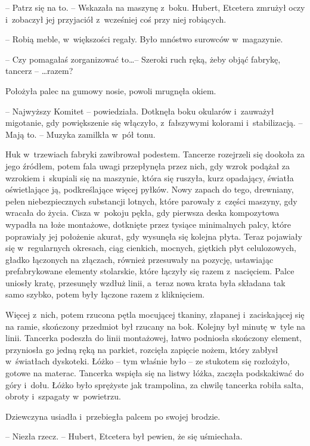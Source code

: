 \documentclass[oneside,polish,11pt,sfheadings]{mwbk}
\begin{document}
-- Patrz się na to. -- Wskazała na maszynę z~boku. Hubert, Etcetera
zmrużył oczy i~zobaczył jej przyjaciół z~wcześniej coś przy niej
robiących. 

-- Robią meble, w~większości regały. Było mnóstwo surowców w~magazynie.

-- Czy pomagałaś zorganizować to\ldots  -- Szeroki ruch ręką, żeby objąć
fabrykę, tancerz -- \ldots  razem?

Położyła palec na gumowy nosie, powoli mrugnęła okiem. 

-- Najwyższy
Komitet -- powiedziała. Dotknęła boku okularów i~zauważył migotanie, gdy
powiększenie się włączyło, z~fałszywymi kolorami i~stabilizacją. -- Mają
to. -- Muzyka zamilkła w~pół tonu.

Huk w~trzewiach fabryki zawibrował podestem. Tancerze rozejrzeli się
dookoła za jego źródłem, potem fala uwagi przepłynęła przez nich, gdy
wzrok podążał za wzrokiem i~skupiali się na maszynie, która się ruszyła,
kurz opadający, światła oświetlające ją, podkreślające więcej pyłków.
Nowy zapach do tego, drewniany, pełen niebezpiecznych substancji
lotnych, które parowały z~części maszyny, gdy wracała do życia. Cisza w~pokoju pękła, gdy pierwsza deska kompozytowa wypadła na łoże montażowe,
dotknięte przez tysiące minimalnych palcy, które poprawiały jej
położenie akurat, gdy wysunęła się kolejna płyta. Teraz pojawiały się w~regularnych okresach, ciąg cienkich, mocnych, giętkich płyt
celulozowych, gładko łączonych na złączach, również przesuwały na
pozycję, ustawiając prefabrykowane elementy stolarskie, które łączyły
się razem z~nacięciem. Palce uniosły kratę, przesunęły wzdłuż linii, a~teraz nowa krata była składana tak samo szybko, potem były łączone razem
z kliknięciem.

Więcej z~nich, potem rzucona pętla mocującej tkaniny, złapanej i~zaciskającej się na ramie, skończony przedmiot był rzucany na bok.
Kolejny był minutę w~tyle na linii. Tancerka podeszła do linii
montażowej, łatwo podniosła skończony element, przyniosła go jedną ręką
na parkiet, rozcięła zapięcie nożem, który zabłysł w~światłach
dyskoteki. Łóżko -- tym właśnie było -- ze stukotem się rozłożyło, gotowe
na materac. Tancerka wspięła się na listwy łóżka, zaczęła podskakiwać do
góry i~dołu. Łóżko było sprężyste jak trampolina, za chwilę tancerka
robiła salta, obroty i~szpagaty w~powietrzu.

Dziewczyna usiadła i~przebiegła palcem po swojej brodzie. 

-- Niezła
rzecz. -- Hubert, Etcetera był pewien, że się uśmiechała.
\end{document}
